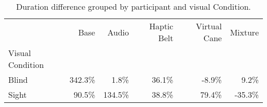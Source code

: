 
\begin{table}[!htb]
\centering
\caption{Duration difference grouped by participant and visual Condition.}
\label{tab:duracao_var_group}
\begin{tabular}{lrrrrr}
\toprule
{} &    Base &   Audio & Haptic Belt & Virtual Cane & Mixture \\
Visual Condition &         &         &             &              &         \\
\midrule
Blind            &  342.3\% &    1.8\% &       36.1\% &        -8.9\% &    9.2\% \\
Sight            &   90.5\% &  134.5\% &       38.8\% &        79.4\% &  -35.3\% \\
\bottomrule
\end{tabular}
\end{table}

